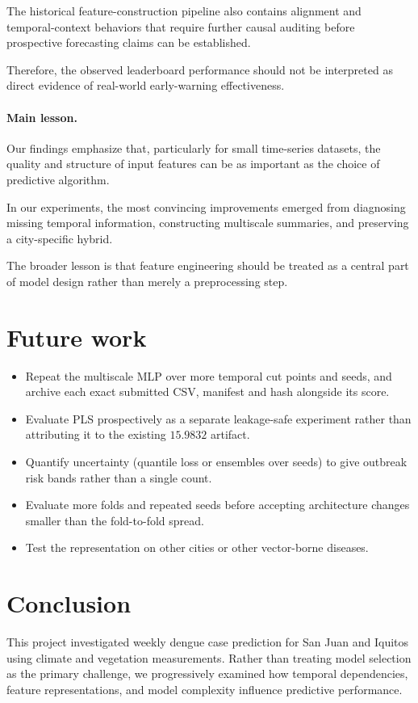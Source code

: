 \documentclass[11pt,a4paper]{article}
\begin{document}
The historical feature-construction pipeline
also contains alignment and temporal-context
behaviors that require further causal auditing
before prospective forecasting claims can
be established.

Therefore, the observed leaderboard performance
should not be interpreted as direct evidence of
real-world early-warning effectiveness.

\paragraph{Main lesson.}

Our findings emphasize that, particularly for
small time-series datasets, the quality and
structure of input features can be as important
as the choice of predictive algorithm.

In our experiments, the most convincing
improvements emerged from diagnosing missing
temporal information, constructing multiscale
summaries, and preserving a city-specific hybrid.

The broader lesson is that feature engineering
should be treated as a central part of model
design rather than merely a preprocessing step.


\section{Future work}
\label{sec:future}
\begin{itemize}
  \item Repeat the multiscale MLP over more temporal cut points and seeds, and archive each exact submitted CSV, manifest and hash alongside its score.
  \item Evaluate PLS prospectively as a separate leakage-safe experiment rather than attributing it to the existing $15.9832$ artifact.
  \item Quantify uncertainty (quantile loss or ensembles over seeds) to give outbreak risk bands rather than a single count.
  \item Evaluate more folds and repeated seeds before accepting architecture changes smaller than the fold-to-fold spread.
  \item Test the representation on other cities or other vector-borne diseases.
\end{itemize}

\section{Conclusion}
This project investigated weekly dengue case prediction for San Juan and Iquitos using climate and vegetation measurements. Rather than treating model selection as the primary challenge, we progressively examined how temporal dependencies, feature representations, and model complexity influence predictive performance.
\end{document}
